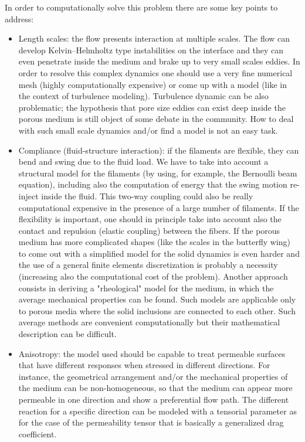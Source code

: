 In order to computationally solve this problem there are some key points to address:
\begin{itemize}
	\item Length scales: the flow presents interaction at multiple scales. The flow can develop Kelvin–Helmholtz type instabilities on the interface and they can even penetrate inside the medium and brake up to very small scales eddies. In order to resolve this complex dynamics one should use a very fine numerical mesh (highly computationally expensive) or come up with a model (like in the context of turbulence modeling).
	Turbulence dynamic can be also problematic; the hypothesis that pore size eddies can exist deep inside the porous medium is still object of some debate in the community.
	How to deal with such small scale dynamics and/or find a model is not an easy task. 
	
	\item Compliance (fluid-structure interaction): if the filaments are flexible, they can bend and swing due to the fluid load.
	We have to take into account a structural model for the filaments (by using, for example, the Bernoulli beam equation), including also the computation of energy that the swing motion re-inject inside the fluid.
	This two-way coupling could also be really computational expensive in the presence of a large number of filaments. If the flexibility is important, one should in principle take into account also the contact and repulsion (elastic coupling) between the fibers.
	If the porous medium has more complicated shapes (like the scales in the butterfly wing) to come out with a simplified model for the solid dynamics is even harder and the use of a general finite elements discretization is probably a necessity (increasing also the computational cost of the problem).
	Another approach consists in deriving a "rheological" model for the medium, in which the average mechanical properties can be found.
	Such models are applicable only to porous media where the solid inclusions are connected to each other. Such average methods are convenient computationally but their mathematical description can be difficult.
	
	\item Anisotropy: the model used should be capable to treat permeable surfaces that have different responses when stressed in different directions. For instance, the geometrical arrangement and/or the mechanical properties of the medium can be non-homogeneous, so that the medium can appear more permeable in one direction and show a preferential flow path. The different reaction for a specific direction can be modeled with a tensorial parameter as for the case of the permeability tensor that is basically a generalized drag coefficient.
\end{itemize}


